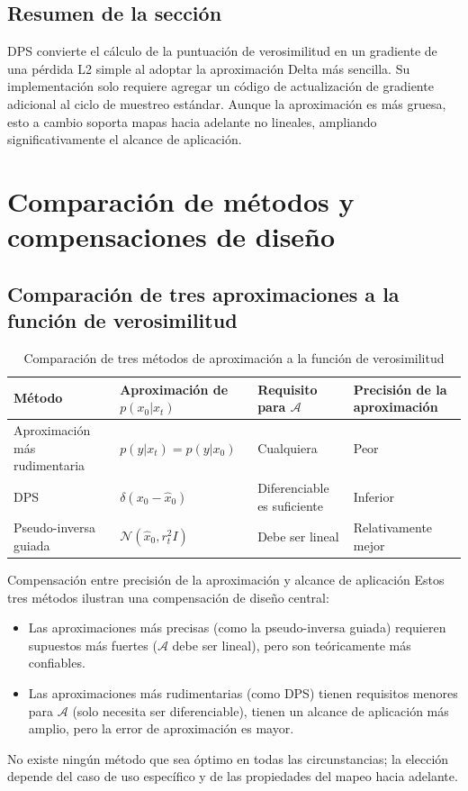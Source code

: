 \documentclass[a4paper]{article}
\begin{document}
\subsection{Resumen de la sección}

DPS convierte el cálculo de la puntuación de verosimilitud en un gradiente de una pérdida L2 simple al adoptar la aproximación Delta más sencilla. Su implementación solo requiere agregar un código de actualización de gradiente adicional al ciclo de muestreo estándar. Aunque la aproximación es más gruesa, esto a cambio soporta mapas hacia adelante no lineales, ampliando significativamente el alcance de aplicación.
\section{Comparación de métodos y compensaciones de diseño}

\subsection{Comparación de tres aproximaciones a la función de verosimilitud}

\begin{table}[H]
\centering
\begin{tabular}{p{}p{}p{}p{}}
\toprule
\textbf{Método} & \textbf{Aproximación de $p(x_0|x_t)$} & \textbf{Requisito para $\mathcal{A}$} & \textbf{Precisión de la aproximación} \\
\midrule
Aproximación más rudimentaria & $p(y|x_t) = p(y|x_0)$ & Cualquiera & Peor \\
DPS & $\delta(x_0 - \hat{x}_0)$ & Diferenciable es suficiente & Inferior \\
Pseudo-inversa guiada & $\mathcal{N}(\hat{x}_0, r_t^2 I)$ & Debe ser lineal & Relativamente mejor \\
\bottomrule
\end{tabular}
\caption{Comparación de tres métodos de aproximación a la función de verosimilitud}
\end{table}

\begin{importantbox}{Compensación entre precisión de la aproximación y alcance de aplicación}
Estos tres métodos ilustran una compensación de diseño central:
\begin{itemize}
    \item Las aproximaciones más precisas (como la pseudo-inversa guiada) requieren supuestos más fuertes ($\mathcal{A}$ debe ser lineal), pero son teóricamente más confiables.
    \item Las aproximaciones más rudimentarias (como DPS) tienen requisitos menores para $\mathcal{A}$ (solo necesita ser diferenciable), tienen un alcance de aplicación más amplio, pero la error de aproximación es mayor.
\end{itemize}
No existe ningún método que sea óptimo en todas las circunstancias; la elección depende del caso de uso específico y de las propiedades del mapeo hacia adelante.
\end{importantbox}
\end{document}
